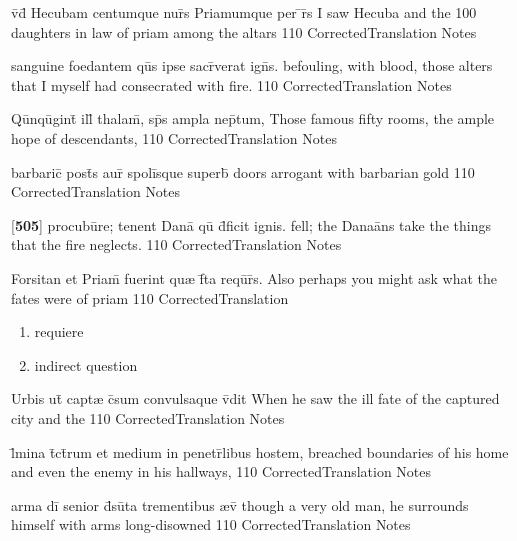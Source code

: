 \latline
  {v\={\macron {\i}}d\={\macron {\i}} Hecubam centumque nur\={}s Priamumque per \={}r\={}s}
  { I saw Hecuba and the 100 daughters in law of priam among the altars }
  {110}
  { CorrectedTranslation }
  { Notes }


\latline
  {sanguine foedantem qu\={}s ipse sacr\={}verat ign\={\macron {\i}}s.}
  { befouling, with blood,  those alters that I myself had consecrated with fire.  }
  {110}
  { CorrectedTranslation }
  { Notes }


\latline
  {Qu\={\macron {\i}}nqu\={}gint\={} ill\={\macron {\i}} thalam\={\macron {\i}}, sp\={}s ampla nep\={}tum,}
  { Those famous fifty rooms, the ample hope of descendants, }
  {110}
  { CorrectedTranslation }
  { Notes }


\latline
  {barbaric\={} post\={}s aur\={} spoli\={\macron {\i}}sque superb\={\macron {\i}}}
  { doors arrogant with barbarian gold  }
  {110}
  { CorrectedTranslation }
  { Notes }


\latline
  {[\textbf{505}] procubu\={}re; tenent Dana\={\macron {\i}} qu\={} d\={}ficit ignis.}
  { fell; the Dana\=ans take the things that the fire neglects. }
  {110}
  { CorrectedTranslation }
  { Notes }


\latline
  {Forsitan et Priam\={\macron {\i}} fuerint qu{\ae} f\={}ta requ\={\macron {\i}}r\={}s.}
  { Also perhaps you might ask what the fates were of priam }
  {110}
  { CorrectedTranslation }
  { \begin{enumerate}
  	\item requiere
  	\item indirect question
  \end{enumerate} }


\latline
  {Urbis ut\={\macron {\i}} capt{\ae} c\={}sum convulsaque v\={\macron {\i}}dit}
  { When he saw the ill fate of the captured city and the  }
  {110}
  { CorrectedTranslation }
  { Notes }


\latline
  {l\={\macron {\i}}mina t\={}ct\={}rum et medium in penetr\={}libus hostem,}
  { breached boundaries of his home and even the enemy in his hallways, }
  {110}
  { CorrectedTranslation }
  { Notes }


\latline
  {arma di\={} senior d\={}su\={}ta trementibus {\ae}v\={}}
  { though a very old man, he surrounds himself with arms long-disowned }
  {110}
  { CorrectedTranslation }
  { Notes }


